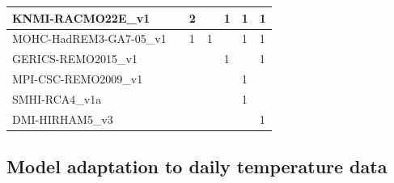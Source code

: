 \begin{table}[H]
{\begin{tabular}{l|l|l|l|l|l|l}
            \hline
            KNMI-RACMO22E\_v1                &              & 2          &
                                             & 1            & 1          & 1
            \\
            \hline
            MOHC-HadREM3-GA7-05\_v1          &              & 1          & 1
                                             &              & 1          & 1
            \\
            \hline
            GERICS-REMO2015\_v1              &              &            &
                                             & 1            &            & 1
            \\
            \hline
            MPI-CSC-REMO2009\_v1             &              &            &
                                             &              & 1          &
            \\
            \hline
            SMHI-RCA4\_v1a                   &              &            &
                                             &              & 1          &
            \\
            \hline
            DMI-HIRHAM5\_v3                  &              &            &
                                             &              &            & 1
            \\
            \hline
        \end{tabular}%
    }
\end{table}

\subsection{Model adaptation to daily temperature data}

